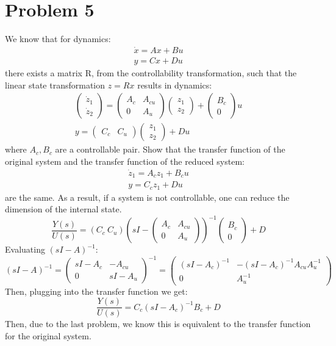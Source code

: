 \documentclass{article}
\begin{document}
\section*{Problem 5}
We know that for dynamics:
\[\begin{array}{c}\dot{x}=Ax+Bu\\y=Cx+Du\end{array}\]
there exists a matrix R, from the controllability transformation, such that the linear state transformation $z=Rx$ results in dynamics:
\[\begin{array}{c}\begin{pmatrix}\dot{z}_1\\\dot{z}_2\end{pmatrix}=\begin{pmatrix}A_c&A_{cu}\\0&A_u\end{pmatrix}\begin{pmatrix}z_1\\z_2\end{pmatrix}+\begin{pmatrix}B_c\\0\end{pmatrix}u\\y=\begin{pmatrix}C_c&C_u\end{pmatrix}\begin{pmatrix}z_1\\z_2\end{pmatrix}+Du\end{array}\]
where $A_c,B_c$ are a controllable pair. Show that the transfer function of the original system and the transfer function of the reduced system:
\[\begin{array}{c}\dot{z}_1=A_cz_1+B_cu\\y=C_cz_1+Du\end{array}\]
are the same. As a result, if a system is not controllable, one can reduce the dimension of the internal state.\\
\[\frac{Y(s)}{U(s)}=(C_c\ C_u)\left(sI-\begin{pmatrix}A_c&A_{cu}\\0&A_u\end{pmatrix}\right)^{-1}\begin{pmatrix}B_c\\0\end{pmatrix}+D\]
Evaluating $(sI-A)^{-1}$:
\[(sI-A)^{-1}=\begin{pmatrix}sI-A_c&-A_{cu}\\0&sI-A_u\end{pmatrix}^{-1}=\begin{pmatrix}(sI-A_{c})^{-1}&-(sI-A_c)^{-1}A_{cu}A_u^{-1}\\0&A_{u}^{-1}\end{pmatrix}\]
Then, plugging into the transfer function we get:
\[\frac{Y(s)}{U(s)}=C_c(sI-A_c)^{-1}B_c+D\]
Then, due to the last problem, we know this is equivalent to the transfer function for the original system.\\
\end{document}
